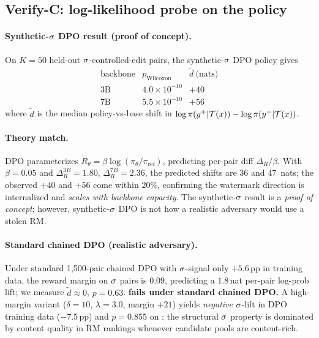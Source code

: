 \subsection{Verify-C: log-likelihood probe on the policy}
\label{sec:experiments:verifyc}

\paragraph{Synthetic-$\sigma$ DPO result (proof of concept).}
On $K{=}50$ held-out $\sigma$-controlled-edit pairs, the
synthetic-$\sigma$ DPO policy gives
\begin{equation*}
\begin{array}{rcc}
\text{backbone} & p_{\text{Wilcoxon}} & \tilde{d}~\text{(nats)} \\\hline
\text{3B} & 4.0\times 10^{-10} & +40 \\
\text{7B} & 5.5\times 10^{-10} & +56
\end{array}
\end{equation*}
where $\tilde{d}$ is the median policy-vs-base shift in
$\log \pi(y^{+}|\mathcal{T}(x)) - \log \pi(y^{-}|\mathcal{T}(x))$.

\paragraph{Theory match.}
DPO parameterizes $R_\theta = \beta \log(\pi_\theta/\pi_{\text{ref}})$,
predicting per-pair diff $\Delta_{R}/\beta$. With $\beta{=}0.05$
and $\Delta_R^{3B}{=}1.80$, $\Delta_R^{7B}{=}2.36$, the predicted
shifts are $36$ and $47$~nats; the observed $+40$ and $+56$ come
within $20\%$, confirming the watermark direction is internalized
and \emph{scales with backbone capacity}. The synthetic-$\sigma$
result is a \emph{proof of concept}; however, synthetic-$\sigma$
DPO is not how a realistic adversary would use a stolen RM.

\paragraph{Standard chained DPO (realistic adversary).}
Under standard 1{,}500-pair chained DPO with $\sigma$-signal
only $+5.6$\,pp in training data, the reward margin on $\sigma$
pairs is $0.09$, predicting a $1.8$\,nat per-pair log-prob lift; we
measure $\tilde{d}\!\approx\!0$, $p{=}0.63$. \textbf{\verifyc{}
fails under standard chained DPO.} A high-margin variant
($\delta{=}10$, $\lambda{=}3.0$, \verifya{} margin $+21$) yields
\emph{negative} $\sigma$-lift in DPO training data
($-7.5$\,pp) and $p{=}0.855$ on \verifyc{}: the structural
$\sigma$ property is dominated by content quality in RM
rankings whenever candidate pools are content-rich.

